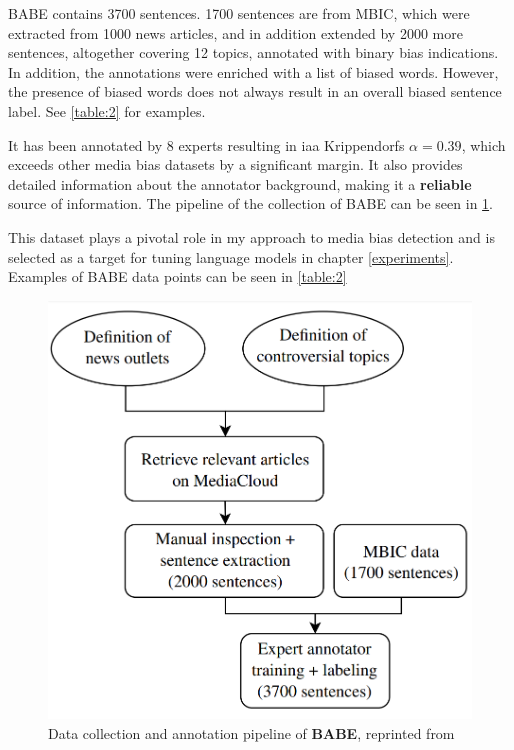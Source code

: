 BABE contains 3700 sentences. 1700 sentences are from MBIC, which were extracted from 1000 news articles, and in addition extended by 2000 more sentences, altogether covering 12 topics, annotated with binary bias indications. In addition, the annotations were enriched with a list of biased words. However, the presence of biased words does not always result in an overall biased sentence label. See \ref{table:2} for examples.

It has been annotated by 8 experts resulting in \gls{iaa} Krippendorfs $\alpha = 0.39$, which exceeds other media bias datasets by a significant margin. It also provides detailed information about the annotator background, making it a \textbf{reliable} source of information. The pipeline of the collection of BABE can be seen in \ref{fig:babe-data}.

This dataset plays a pivotal role in my approach to media bias detection and is selected as a target for tuning language models in chapter \ref{experiments}. Examples of BABE data points can be seen in 
\ref{table:2}




\begin{figure}
  \includegraphics[scale=0.3]{my_modules/multimedia/babe_workflow.png}
  \caption{Data collection and annotation pipeline of \textbf{BABE}, reprinted from \cite{Spinde2021f}}
  \label{fig:babe-data}
\end{figure}



